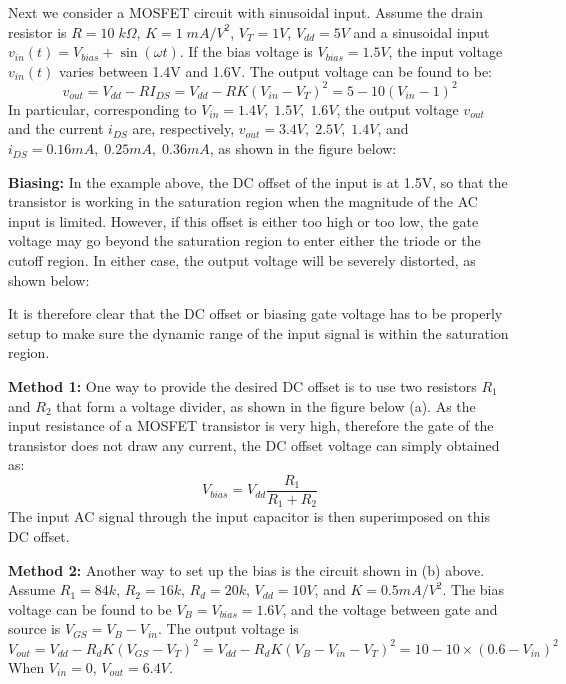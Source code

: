 Next we consider a MOSFET circuit with sinusoidal input. Assume the drain resistor
is $R=10\;k\Omega$, $K=1\;mA/V^2$, $V_T=1V$, $V_{dd}=5V$ and a sinusoidal input 
$v_{in}(t)=V_{bias}+\sin(\omega t)$. If the bias voltage is $V_{bias}=1.5V$, the
input voltage $v_{in}(t)$ varies between 1.4V and 1.6V. The output voltage can be
found to be:
\[ v_{out}=V_{dd}-RI_{DS}=V_{dd}-RK(V_{in}-V_T)^2=5-10 (V_{in}-1)^2 \]
In particular, corresponding to $V_{in}=1.4V,\;1.5V,\;1.6V$, the output voltage 
$v_{out}$ and the current $i_{DS}$ are, respectively, $v_{out}=3.4V,\;2.5V,\;1.4V$, 
and $i_{DS}=0.16mA,\;0.25mA,\;0.36mA$, as shown in the figure below:


{\bf Biasing:} In the example above, the DC offset of the input is at 1.5V, so that
the transistor is working in the saturation region when the magnitude of the AC input
is limited. However, if this offset is either too high or too low, the gate voltage
may go beyond the saturation region to enter either the triode or the cutoff region.
In either case, the output voltage will be severely distorted, as shown below:


It is therefore clear that the DC offset or biasing gate voltage has to be properly
setup to make sure the dynamic range of the input signal is within the saturation 
region. 

{\bf Method 1:} One way to provide the desired DC offset is to use two resistors 
$R_1$ and $R_2$ that form a voltage divider, as shown in the figure below (a). As 
the input resistance of a MOSFET transistor is very high, therefore the gate of 
the transistor does not draw any current, the DC offset voltage can simply obtained
as:
\[ V_{bias}=V_{dd}\frac{R_1}{R_1+R_2} \]
The input AC signal through the input capacitor is then superimposed on this DC 
offset. 


{\bf Method 2: } Another way to set up the bias is the circuit shown in (b) above.
Assume $R_1=84k$, $R_2=16k$, $R_d=20k$, $V_{dd}=10V$, and $K=0.5mA/V^2$.  The bias 
voltage can be found to be $V_B=V_{bias}=1.6V$, and the voltage between gate and 
source is $V_{GS}=V_B-V_{in}$. The output voltage is
\[ V_{out}=V_{dd}-R_d K (V_{GS}-V_T)^2=V_{dd}-R_d K (V_B-V_{in}-V_T)^2=10-10\times 
(0.6-V_{in})^2  \]
When $V_{in}=0$, $V_{out}=6.4V$.

